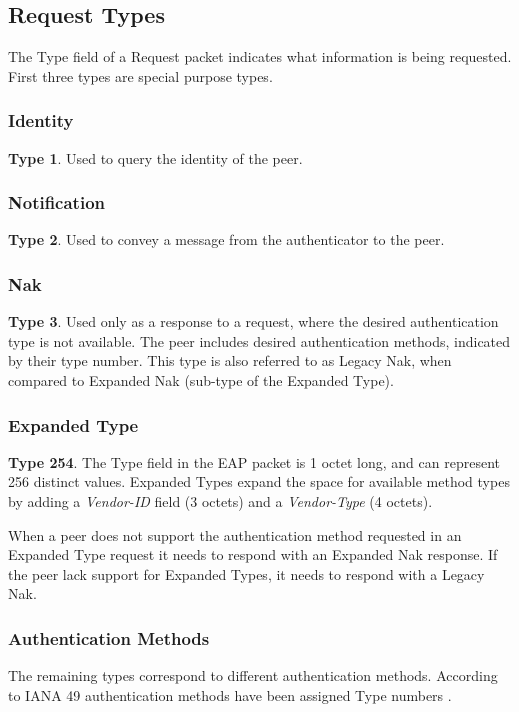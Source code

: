 
\subsection{Request Types}

The Type field of a Request packet indicates what information is being requested. First three types are special purpose types.

\subsubsection{Identity} \textbf{Type 1}. Used to query the identity of the peer.

\subsubsection{Notification} \textbf{Type 2}. Used to convey a message from the authenticator to the peer.

\subsubsection{Nak} \textbf{Type 3}. Used only as a response to a request, where the desired authentication type is not available.
The peer includes desired authentication methods, indicated by their type number.
This type is also referred to as Legacy Nak, when compared to Expanded Nak (sub-type of the Expanded Type).

\subsubsection{Expanded Type} \textbf{Type 254}. The Type field in the EAP packet is 1 octet long, and can represent 256 distinct values.
Expanded Types expand the space for available method types by adding a \textit{Vendor-ID} field (3 octets) and a \textit{Vendor-Type} (4 octets).

When a peer does not support the authentication method requested in an Expanded Type request it needs to respond with an Expanded Nak response. 
If the peer lack support for Expanded Types, it needs to respond with a Legacy Nak.

\subsubsection{Authentication Methods}
The remaining types correspond to different authentication methods.
According to IANA 49 authentication methods have been assigned Type numbers \cite{joseph2004eap}.


